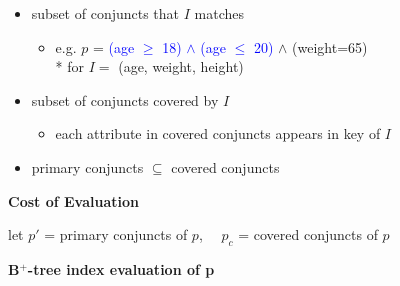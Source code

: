 \documentclass[8pt, landscape]{extarticle}
\begin{document}
\begin{multicols*}{4}
  \begin{itemize}
    \item {} subset of conjuncts that $I$ matches
      \begin{itemize}
        \item e.g. $p$ = \textcolor{blue}{(age $\geq$ 18) $\land$ (age $\leq$ 20)} $\land$ (weight=65) 
          \\* for $I=$ (age, weight, height)
      \end{itemize}
    \item {} subset of conjuncts covered by $I$
      \begin{itemize}
        \item each attribute in covered conjuncts appears in key of $I$
      \end{itemize}
    \item primary conjuncts $\subseteq$ covered conjuncts
  \end{itemize}

  \textbf{Cost of Evaluation}

  let $p'$ = primary conjuncts of $p$, $\quad p_c$ = covered conjuncts of $p$

  \textbf{B$^+$-tree index evaluation of p}


\end{multicols*}
\end{document}
